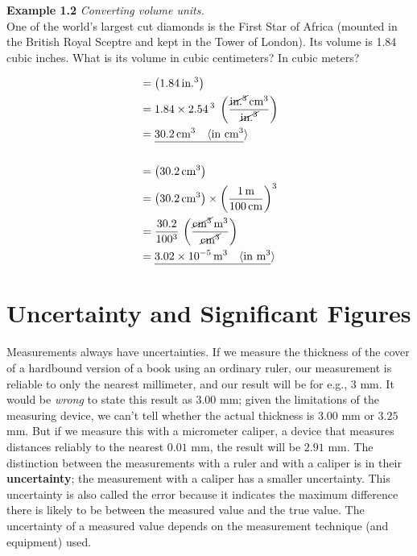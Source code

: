 \begin{examplebox}
\textbf{Example 1.2} \textit{Converting volume units.}\\

One of the world’s largest cut diamonds is the First Star of Africa (mounted in the British Royal Sceptre and kept in the Tower of
London). Its volume is 1.84 cubic inches. What is its volume in cubic centimeters? In cubic meters?
\begin{mathbox}
\begin{align*}
&= \left(1.84\, \text{in.}^3\right) \\
&= 1.84 \times 2.54 \, ^ 3 \; \left(\frac{\cancel{\text{in.}^3} \, \text{cm}^3} {\cancel{\text{in.}^3}} \right) \\
&= \underline{30.2 \, \text{cm}^3 \quad \langle\text{in cm$^3$}}\rangle \\ \\
&= \left(30.2 \, \text{cm}^3\right) \\
&= \left(30.2 \, \text{cm}^3\right) \times \left(\frac{1 \, \text{m}}{100 \, \text{cm}} \right) ^ 3 \\
&= \frac{30.2}{100^3} \, \left(\frac{\cancel{\text{cm}^3} \, \text{m}^3 }{\cancel{\text{cm}^3}} \right) \\
&= \underline{3.02 \times 10^{-5} \, \text{m}^3 \quad \langle\text{in m$^3$}}\rangle
\end{align*}
\end{mathbox}
\end{examplebox}

\section{Uncertainty and Significant Figures}
Measurements always have uncertainties. If we measure the thickness of the cover of a hardbound version of a book using an ordinary ruler, our measurement is reliable to only the nearest millimeter, and our result will be for e.g., $3$ mm. It would be \textit{wrong} to state this result as $3.00$ mm; given the limitations of the measuring device, we can't tell whether the actual thickness is $3.00$ mm or $3.25$ mm. But if we measure this with a micrometer caliper, a device that measures distances reliably to the nearest $0.01$ mm, the result will be $2.91$ mm. The distinction between the measurements with a ruler and with a caliper is in their \textbf{uncertainty}; the measurement with a caliper has a smaller uncertainty. This uncertainty is also called the error because it indicates the maximum difference there is likely to be between the measured value and the true value. The uncertainty of a measured value depends on the measurement technique (and equipment) used.


